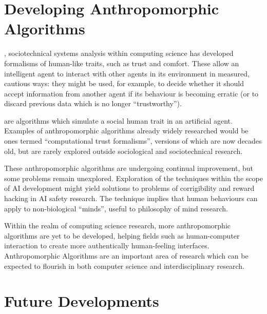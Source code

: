 



\section{Developing Anthropomorphic Algorithms}

, sociotechnical systems analysis within computing science has developed formalisms of human-like traits, such as trust and comfort. These allow an intelligent agent to interact with other agents in its environment in measured, cautious ways: they might be used, for example, to decide whether it should accept information from another agent if its behaviour is becoming erratic (or to discard previous data which is no longer ``trustworthy'').\par

 are algorithms which simulate a social human trait in an artificial agent. Examples of anthropomorphic algorithms already widely researched would be ones termed ``computational trust formalisms'', versions of which are now decades old\cite{marsh1994}, but are rarely explored outside sociological and sociotechnical research.\par

These anthropomorphic algorithms are undergoing continual improvement\cite{kramdi, Urbano2014}, but some problems remain unexplored. Exploration of the techniques within the scope of AI development might yield solutions to problems of corrigibility\cite{corrigibility} and reward hacking\cite{concrete_problems} in AI safety research. The technique implies that human behaviours can apply to non-biological ``minds'', useful to philosophy of mind research\cite{sloman_spaceofminds}.\par 

Within the realm of computing science research, more anthropomorphic algorithms are yet to be developed, helping fields such as human-computer interaction to create more authentically human-feeling interfaces. Anthropomorphic Algorithms are an important area of research which can be expected to flourish in both computer science and interdisciplinary research.

\section{Future Developments}

